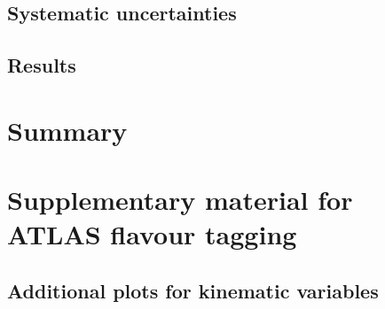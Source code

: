 \documentclass[letterpaper,12pt]{article}
\begin{document}
\subsection{Systematic uncertainties}
\subsection{Results}




\section{Summary}







\printbibliography
\appendix
\newpage
\section{Supplementary material for ATLAS flavour tagging}
\subsection{Additional plots for kinematic variables}
\end{document}
